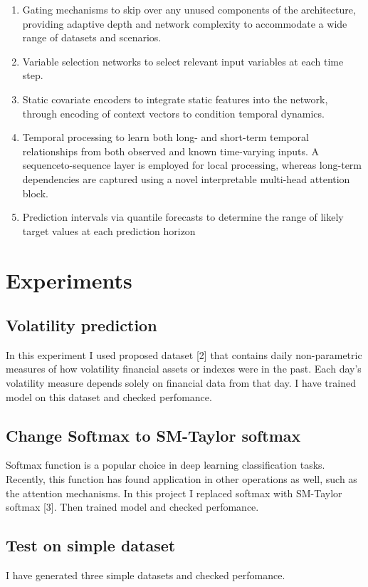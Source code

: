 \documentclass[tablecaption=bottom,nowcp]{jmlr}%
\begin{document}
\begin{enumerate}
\item Gating mechanisms to skip over any unused components of the architecture, providing adaptive depth and network complexity to accommodate a wide range of datasets and scenarios.
\item Variable selection networks to select relevant input variables at each time step.
\item Static covariate encoders to integrate static features into the network, through encoding of context vectors to condition temporal dynamics.
\item Temporal processing to learn both long- and short-term temporal relationships from both observed and known time-varying inputs. A sequenceto-sequence layer is employed for local processing, whereas long-term dependencies are captured using a novel interpretable multi-head attention block.
\item Prediction intervals via quantile forecasts to determine the range of likely target values at each prediction horizon
\end{enumerate}

\section{Experiments}
\label{sec:exp}

\subsection{Volatility prediction}
\label{sec:vol}
In this experiment I used proposed dataset [2] that contains daily non-parametric measures of how volatility financial assets or indexes were in the past. Each day's volatility measure depends solely on financial data from that day. I have trained model on this dataset and checked perfomance.

\subsection{Change Softmax to SM-Taylor softmax}
\label{sec:smx}
Softmax function is a popular choice in deep learning classification tasks. Recently,
this function has found application in other operations as well, such as the attention mechanisms. In this project I replaced softmax with SM-Taylor softmax [3]. Then trained model and checked perfomance.

\subsection{Test on simple dataset}
\label{sec:smx}
I have generated three simple datasets and checked perfomance.
\end{document}
